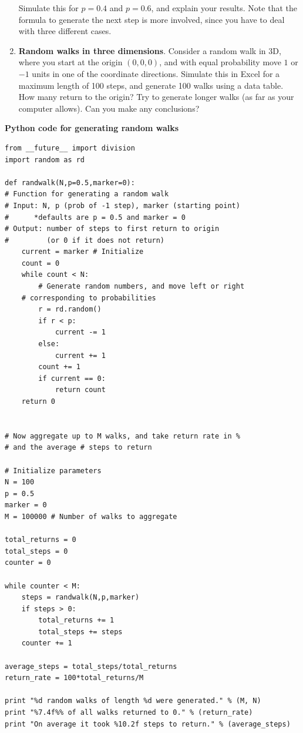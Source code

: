 \begin{enumerate}[label={3.\arabic*},leftmargin=1cm]
		Simulate this for $p = 0.4$ and $p = 0.6$, and explain your results.
		Note that the formula to generate the next step is more involved, since you have to deal with three different cases.
	\item \textbf{Random walks in three dimensions}.
		Consider a random walk in 3D, where you start at the origin $(0,0,0)$, and with equal probability move $1$ or $-1$ units in one of the coordinate directions.
		Simulate this in Excel for a maximum length of 100 steps, and generate 100 walks using a data table. How many return to the origin?
		Try to generate longer walks (as far as your computer allows).
		Can you make any conclusions?

\end{enumerate}


{\small

\textbf{Python code for generating random walks}
\vspace{-0.5cm}

\begin{verbatim}
from __future__ import division
import random as rd

def randwalk(N,p=0.5,marker=0):
# Function for generating a random walk
# Input: N, p (prob of -1 step), marker (starting point)
#      *defaults are p = 0.5 and marker = 0
# Output: number of steps to first return to origin 
#         (or 0 if it does not return)
    current = marker # Initialize
    count = 0
    while count < N:
        # Generate random numbers, and move left or right
	# corresponding to probabilities
        r = rd.random()
        if r < p:
            current -= 1
        else:
            current += 1
        count += 1
        if current == 0:
            return count
    return 0


# Now aggregate up to M walks, and take return rate in % 
# and the average # steps to return

# Initialize parameters
N = 100
p = 0.5 
marker = 0
M = 100000 # Number of walks to aggregate

total_returns = 0
total_steps = 0
counter = 0

while counter < M:
    steps = randwalk(N,p,marker)
    if steps > 0:
        total_returns += 1
        total_steps += steps
    counter += 1

average_steps = total_steps/total_returns
return_rate = 100*total_returns/M

print "%d random walks of length %d were generated." % (M, N)
print "%7.4f%% of all walks returned to 0." % (return_rate)
print "On average it took %10.2f steps to return." % (average_steps)
\end{verbatim}

}

